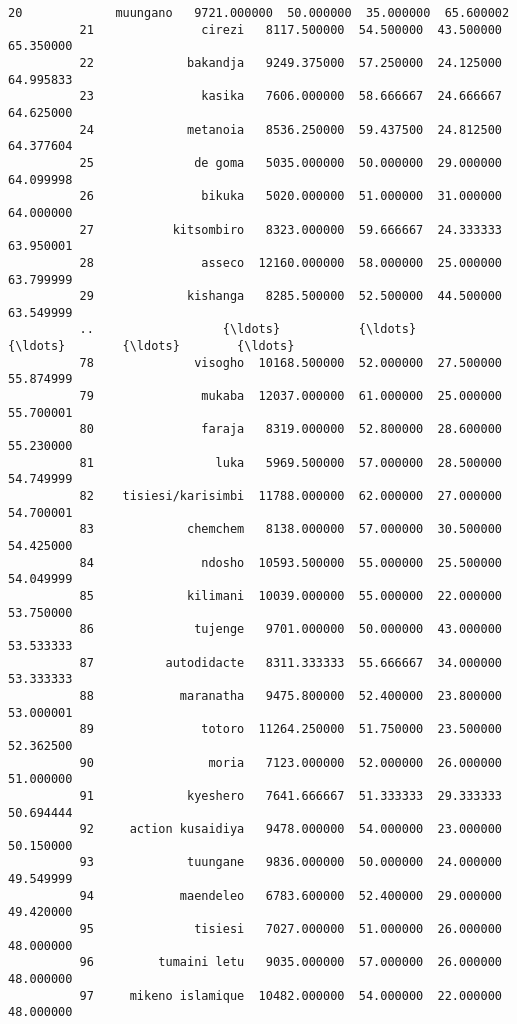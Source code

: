 \documentclass[11pt]{article}
\begin{document}
\begin{Verbatim}[commandchars=\\\{\}]
          20             muungano   9721.000000  50.000000  35.000000  65.600002   
          21               cirezi   8117.500000  54.500000  43.500000  65.350000   
          22             bakandja   9249.375000  57.250000  24.125000  64.995833   
          23               kasika   7606.000000  58.666667  24.666667  64.625000   
          24             metanoia   8536.250000  59.437500  24.812500  64.377604   
          25              de goma   5035.000000  50.000000  29.000000  64.099998   
          26               bikuka   5020.000000  51.000000  31.000000  64.000000   
          27           kitsombiro   8323.000000  59.666667  24.333333  63.950001   
          28               asseco  12160.000000  58.000000  25.000000  63.799999   
          29             kishanga   8285.500000  52.500000  44.500000  63.549999   
          ..                  {\ldots}           {\ldots}        {\ldots}        {\ldots}        {\ldots}   
          78              visogho  10168.500000  52.000000  27.500000  55.874999   
          79               mukaba  12037.000000  61.000000  25.000000  55.700001   
          80               faraja   8319.000000  52.800000  28.600000  55.230000   
          81                 luka   5969.500000  57.000000  28.500000  54.749999   
          82    tisiesi/karisimbi  11788.000000  62.000000  27.000000  54.700001   
          83             chemchem   8138.000000  57.000000  30.500000  54.425000   
          84               ndosho  10593.500000  55.000000  25.500000  54.049999   
          85             kilimani  10039.000000  55.000000  22.000000  53.750000   
          86              tujenge   9701.000000  50.000000  43.000000  53.533333   
          87          autodidacte   8311.333333  55.666667  34.000000  53.333333   
          88            maranatha   9475.800000  52.400000  23.800000  53.000001   
          89               totoro  11264.250000  51.750000  23.500000  52.362500   
          90                moria   7123.000000  52.000000  26.000000  51.000000   
          91             kyeshero   7641.666667  51.333333  29.333333  50.694444   
          92     action kusaidiya   9478.000000  54.000000  23.000000  50.150000   
          93             tuungane   9836.000000  50.000000  24.000000  49.549999   
          94            maendeleo   6783.600000  52.400000  29.000000  49.420000   
          95              tisiesi   7027.000000  51.000000  26.000000  48.000000   
          96         tumaini letu   9035.000000  57.000000  26.000000  48.000000   
          97     mikeno islamique  10482.000000  54.000000  22.000000  48.000000   

\end{Verbatim}
\end{document}
